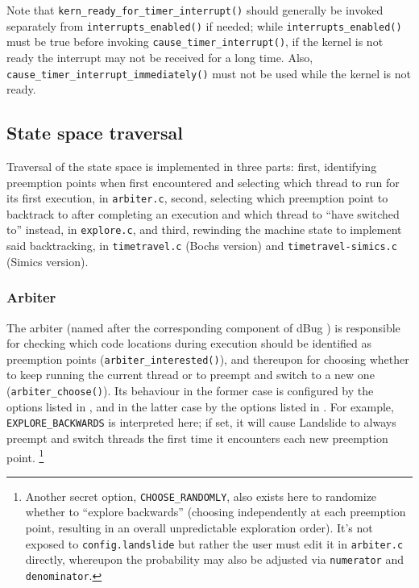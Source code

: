 Note that {\tt kern\_ready\_for\_timer\_interrupt()} should generally be invoked separately
from {\tt interrupts\_enabled()} if needed;
while {\tt interrupts\_enabled()} must be true before invoking {\tt cause\_timer\_interrupt()},
if the kernel is not ready the interrupt may not be received for a long time.
Also, {\tt cause\_timer\_interrupt\_immediately()} must not be used while the kernel is not ready.


\subsection{State space traversal}
\label{sec:landslide-statespace}

Traversal of the state space is implemented in three parts:
first, identifying preemption points when first encountered and selecting which thread to run for its first execution, in {\tt arbiter.c},
second, selecting which preemption point to backtrack to after completing an execution
and which thread to ``have switched to'' %
instead, in {\tt explore.c},
and third, rewinding the machine state to implement said backtracking,
in {\tt timetravel.c} (Bochs version) and {\tt timetravel-simics.c} (Simics version).

\subsubsection{Arbiter}
\label{sec:landslide-arbiter}

The arbiter (named after the corresponding component of dBug \cite{dbug-ssv})
is responsible for checking which code locations during execution should be identified as preemption points
({\tt arbiter\_interested()}),
and thereupon for choosing whether to keep running the current thread or to preempt and switch to a new one
({\tt arbiter\_choose()}).
Its behaviour in the former case is configured by the options listed in \sect{\ref{sec:landslide-dynamicconfig}},
and in the latter case by the options listed in \sect{\ref{sec:landslide-staticconfig}}.
For example, {\tt EXPLORE\_BACKWARDS} is interpreted here;
if set, it will cause Landslide to always preempt and switch threads the first time it encounters each new preemption point.%
\footnote{Another secret option, {\tt CHOOSE\_RANDOMLY},
also exists here to randomize whether to ``explore backwards''
(choosing independently at each preemption point, resulting in an overall unpredictable exploration order).
It's not exposed to {\tt config.landslide} but rather the user must edit it in {\tt arbiter.c} directly,
whereupon the probability may also be adjusted via {\tt numerator} and {\tt denominator}.}

